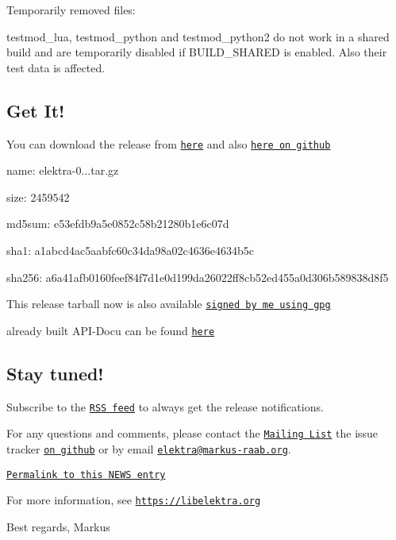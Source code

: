 Temporarily removed files\+:


\begin{DoxyItemize}
\item {\ttfamily testmod\+\_\+lua}, {\ttfamily testmod\+\_\+python} and {\ttfamily testmod\+\_\+python2} do not work in a shared build and are temporarily disabled if {\ttfamily B\+U\+I\+L\+D\+\_\+\+S\+H\+A\+R\+ED} is enabled. Also their test data is affected.
\end{DoxyItemize}

\subsection*{Get It!}

You can download the release from \href{https://www.libelektra.org/ftp/elektra/releases/elektra-0.8.17.tar.gz}{\tt here} and also \href{https://github.com/ElektraInitiative/ftp/tree/master/releases/elektra-0.8.17.tar.gz}{\tt here on github}


\begin{DoxyItemize}
\item name\+: elektra-\/0...\+tar.\+gz
\item size\+: 2459542
\item md5sum\+: e53efdb9a5e0852c58b21280b1e6c07d
\item sha1\+: a1abcd4ac5aabfc60c34da98a02c4636e4634b5c
\item sha256\+: a6a41afb0160feef84f7d1e0d199da26022ff8cb52ed455a0d306b589838d8f5
\end{DoxyItemize}

This release tarball now is also available \href{https://www.libelektra.org/ftp/elektra/releases/elektra-0.8.17.tar.gz.gpg}{\tt signed by me using gpg}

already built A\+P\+I-\/\+Docu can be found \href{https://doc.libelektra.org/api/0.8.17/html/}{\tt here}

\subsection*{Stay tuned!}

Subscribe to the \href{https://doc.libelektra.org/news/feed.rss}{\tt R\+SS feed} to always get the release notifications.

For any questions and comments, please contact the \href{https://lists.sourceforge.net/lists/listinfo/registry-list}{\tt Mailing List} the issue tracker \href{https://git.libelektra.org/issues}{\tt on github} or by email \href{mailto:elektra@markus-raab.org}{\tt elektra@markus-\/raab.\+org}.

\href{https://doc.libelektra.org/news/e6153a39-c4bd-41c3-bc86-785d451eb6c5.html}{\tt Permalink to this N\+E\+WS entry}

For more information, see \href{https://libelektra.org}{\tt https\+://libelektra.\+org}

Best regards, Markus 